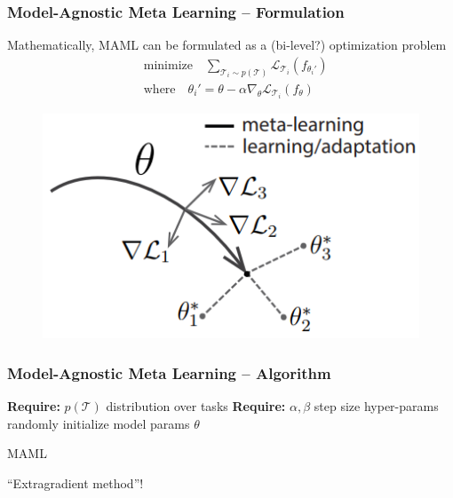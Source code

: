 
\begin{frame}
\frametitle{Model-Agnostic Meta Learning -- Formulation}

Mathematically, MAML can be formulated as a (bi-level?) optimization problem
\begin{align*}
    & \text{minimize} \quad \sum\limits_{\mathcal{T}_i\sim p(\mathcal{T})} \mathcal{L}_{\mathcal{T}_i} (f_{\theta_i'}) \\
    & \text{where} \quad \theta_i' = \theta - \alpha \nabla_{\theta} \mathcal{L}_{\mathcal{T}_i}(f_{\theta})
\end{align*}

\begin{figure}
    \centering
    \includegraphics[keepaspectratio,width=.65\textwidth]{images/maml.png}
\end{figure}

\end{frame}


\begin{frame}
\frametitle{Model-Agnostic Meta Learning -- Algorithm}

\begin{algorithm}[H]
\SetAlgoNoLine
\DontPrintSemicolon
{\bfseries Require:} $p(\mathcal{T})$ distribution over tasks\;
{\bfseries Require:} $\alpha, \beta$ step size hyper-params\;
randomly initialize model params $\theta$\;
\caption{MAML\cite{finn2017maml}}
\end{algorithm}

\pause

``Extragradient method''!

\end{frame}

